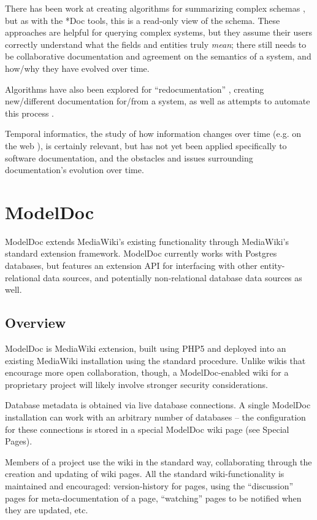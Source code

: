 \documentclass[nocopyrightspace]{acm_proc_article-sp}
\begin{document}
There has been work at creating algorithms for summarizing complex schemas
\cite{jag:summarization} \cite{yang:summarizing}, but as with the *Doc tools,
this is a read-only view of the schema.  These approaches are helpful for
querying complex systems, but they assume their users correctly understand
what the fields and entities truly \textit{mean}; there still needs to be
collaborative documentation and agreement on the semantics of a system, and
how/why they have evolved over time.

Algorithms have also been explored for ``redocumentation''
\cite{rajlich:webredoc}, creating new/different documentation for/from a
system, as well as attempts to automate this process \cite{anquetil:atool}.

Temporal informatics, the study of how information changes over time (e.g. on
the web \cite{adar:zoetrope}), is certainly relevant, but has not yet been
applied specifically to software documentation, and the obstacles and issues
surrounding documentation's evolution over time.

\section{ModelDoc}

ModelDoc extends MediaWiki's existing functionality through MediaWiki's
standard extension framework.  ModelDoc currently works with Postgres
databases, but features an extension API for interfacing with other
entity-relational data sources, and potentially non-relational database data
sources as well.

\subsection{Overview}

ModelDoc is MediaWiki extension, built using PHP5 and deployed into an existing
MediaWiki installation using the standard procedure.  Unlike wikis that
encourage more open collaboration, though, a ModelDoc-enabled wiki for a
proprietary project will likely involve stronger security considerations.

Database metadata is obtained via live database connections.  A single ModelDoc
installation can work with an arbitrary number of databases -- the
configuration for these connections is stored in a special ModelDoc wiki page
(see Special Pages).

Members of a project use the wiki in the standard way, collaborating through
the creation and updating of wiki pages.  All the standard wiki-functionality
is maintained and encouraged: version-history for pages, using the
``discussion'' pages for meta-documentation of a page, ``watching'' pages to be
notified when they are updated, etc.
\end{document}

